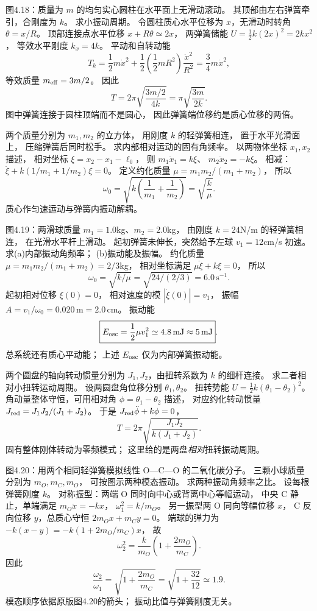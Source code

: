 图4.18：质量为 $m$ 的均匀实心圆柱在水平面上无滑动滚动。
其顶部由左右弹簧牵引，合刚度为 $k$。
求小振动周期。
\exsolution
令圆柱质心水平位移为 $x$，无滑动时转角
$\theta=x/R$。
顶部连接点水平位移
$x+R\theta\simeq2x$，
两弹簧储能
$U=\tfrac12k(2x)^2=2kx^2$，
等效水平刚度 $k_x=4k$。
平动和自转动能
\[
T_k=\frac12m\dot x^2+
\frac12\left(\frac12mR^2\right)
\frac{\dot x^2}{R^2}
=\frac34m\dot x^2,
\]
等效质量 $m_{\rm eff}=3m/2$。
因此
\[
\boxed{T=2\pi\sqrt{\frac{3m/2}{4k}}
=\pi\sqrt{\frac{3m}{2k}}}.
\]
\excheck 图中弹簧连接于圆柱顶端而不是圆心，
因此弹簧端位移约是质心位移的两倍。

两个质量分别为 $m_1,m_2$ 的立方体，
用刚度 $k$ 的轻弹簧相连，
置于水平光滑面上，
压缩弹簧后同时松手。
求内部相对运动的固有角频率。
\exsolution
以两物体坐标 $x_1,x_2$ 描述，
相对坐标
$\xi=x_2-x_1-\ell_0$，
则
$m_1\ddot x_1=k\xi$、
$m_2\ddot x_2=-k\xi$。
相减：
$\ddot\xi+k(1/m_1+1/m_2)\xi=0$。
定义约化质量
$\mu=m_1m_2/(m_1+m_2)$，
所以
\[
\boxed{\omega_0=\sqrt{k\left(\frac1{m_1}+
\frac1{m_2}\right)}=\sqrt{\frac k\mu}}.
\]
\excheck 质心作匀速运动与弹簧内振动解耦。

图4.19：两滑球质量
$m_1=1.0$kg、$m_2=2.0$kg，
由刚度 $k=24$N/m 的轻弹簧相连，
在光滑水平杆上滑动。
起初弹簧未伸长，突然给予左球
$v_1=12$cm/s 初速。
求(a)内部振动角频率；
(b)振动能及振幅。
\exsolution
约化质量
$\mu=m_1m_2/(m_1+m_2)=2/3$kg，
相对坐标满足
$\mu\ddot\xi+k\xi=0$，
所以
\[
\boxed{\omega_0=\sqrt{k/\mu}
=\sqrt{24/(2/3)}=6.0\,\mathrm{s^{-1}}}.
\]
起初相对位移 $\xi(0)=0$，
相对速度的模 $|\dot\xi(0)|=v_1$，
振幅
$\boxed{A=v_1/\omega_0=0.020\,\mathrm m=2.0\,\mathrm{cm}}$。
振动能
\[
\boxed{E_{\rm osc}=\frac12\mu v_1^2
\simeq4.8\,\mathrm{mJ}\approx5\,\mathrm{mJ}}.
\]
\excheck 总系统还有质心平动能；
上述 $E_{\rm osc}$ 仅为内部弹簧振动能。

两个圆盘的轴向转动惯量分别为
$J_1,J_2$，由扭转系数为 $k$ 的细杆连接。
求二者相对小扭转运动周期。
\exsolution
设两圆盘角位移分别
$\theta_1,\theta_2$。
扭转势能
$U=\tfrac12k(\theta_1-\theta_2)^2$。
角动量整体守恒，可用相对角
$\phi=\theta_1-\theta_2$ 描述，
对应约化转动惯量
$J_{\rm red}=J_1J_2/(J_1+J_2)$。
于是
$J_{\rm red}\ddot\phi+k\phi=0$，
\[
\boxed{T=2\pi\sqrt{\frac{J_1J_2}{k(J_1+J_2)}}}.
\]
\excheck 固有整体刚体转动为零频模式；
这里给的是两盘\emph{相对}扭转振动周期。

图4.20：用两个相同轻弹簧模拟线性
O—C—O 的二氧化碳分子。
三颗小球质量分别为
$m_O,m_C,m_O$，
可按图示两种模态振动。
求两种振动角频率之比。
\exsolution
设每根弹簧刚度 $k$。
对称振型：两端 O 同时向中心或背离中心等幅运动，
中央 C 静止，单端满足
$m_O\ddot x=-kx$，
$\omega_1^2=k/m_O$。
另一振型两 O 同向等幅位移 $x$，
C 反向位移 $y$，总质心守恒
$2m_Ox+m_Cy=0$。
端球的弹力为
$-k(x-y)=-k(1+2m_O/m_C)x$，
故
\[
\omega_2^2=\frac{k}{m_O}
\left(1+\frac{2m_O}{m_C}\right).
\]
因此
\[
\boxed{\frac{\omega_2}{\omega_1}
=\sqrt{1+\frac{2m_O}{m_C}}
=\sqrt{1+\frac{32}{12}}\simeq1.9}.
\]
\excheck 模态顺序依据原版图4.20的箭头；
振动比值与弹簧刚度无关。

